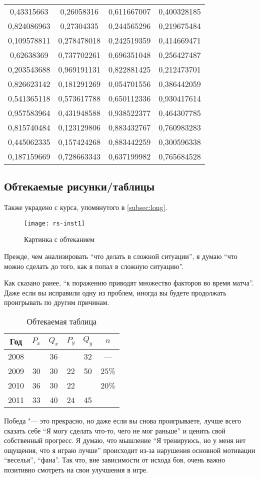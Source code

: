 \begin{longtable}{|c|c|c|c|}
0,43315663  & 0,26058316  & 0,611667007 & 0,400328185 \\
0,824086963 & 0,27304335  & 0,244565296 & 0,219675484 \\
0,109578811 & 0,278478018 & 0,242519359 & 0,414669471 \\
0,62638369  & 0,737702261 & 0,696351048 & 0,256427487 \\
0,203543688 & 0,969191131 & 0,822881425 & 0,212473701 \\
0,826623142 & 0,181291269 & 0,054701556 & 0,386442059 \\
0,541365118 & 0,573617788 & 0,650112336 & 0,930417614 \\
0,957583964 & 0,431948588 & 0,938522377 & 0,464307785 \\
0,815740484 & 0,123129806 & 0,883432767 & 0,760983283 \\
0,445062335 & 0,157424268 & 0,883442259 & 0,300596338 \\
0,187159669 & 0,728663343 & 0,637199982 & 0,765684528 \\
\end{longtable}

\subsection{Обтекаемые рисунки/таблицы}
Также украдено с курса, упомянутого в \ref{subsec:long}. ~\\

\begin{wrapfigure}{l}{0.5\linewidth}
	\texttt{[image: rs-inst1]}
	\caption{Картинка с обтеканием}
\end{wrapfigure}
Прежде, чем анализировать "`что делать в сложной ситуации"', я думаю "`что можно сделать до того, как я попал в сложную ситуацию"'. 

Как сказано ранее, "`к поражению приводят множество факторов во время матча"'. Даже если вы исправили одну из проблем, иногда вы будете продолжать проигрывать по другим причинам.

\begin{wraptable}{r}{0.5\linewidth}
	\centering
	\begin{tabular}{|c|c|c|c|c|c|}
		\hline
		Год  & $P_x$ & $Q_x$ & $P_y$ & $Q_y$ & $n$  \\ \hline
		2008 &       & 36    &       & 32    & — 	\\ \hline
		2009 & 30    & 30    & 22    & 50    & 25\% \\ \hline
		2010 & 36    & 30    & 22    &       & 20\% \\ \hline
		2011 & 33    & 40    & 24    & 45    & 		\\ \hline
	\end{tabular}
	\caption{Обтекаемая таблица}
\end{wraptable}
Победа "--- это прекрасно, но даже если вы снова проигрываете, лучше всего сказать себе
"`Я могу сделать что-то, чего не мог раньше"' и ценить свой собственный прогресс.
Я думаю, что мышление "`Я тренируюсь, но у меня нет ощущения, что я играю лучше"' происходит из-за нарушения основной мотивации "`веселья"', "`фана"'. Так что, вне зависимости от исхода боя, очень важно позитивно смотреть на свои улучшения в игре.

